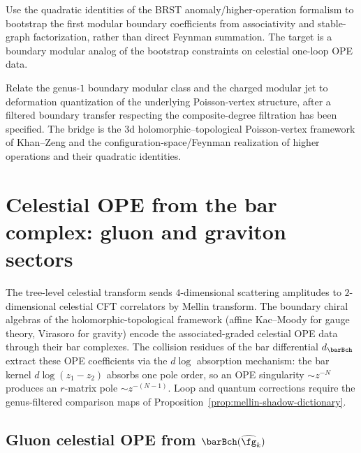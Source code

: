 \begin{problem}
\label{prob:modular-bootstrap}
Use the quadratic identities of the BRST anomaly/higher-operation formalism to bootstrap the
first modular boundary coefficients from associativity and stable-graph factorization,
rather than direct Feynman summation. The target is a boundary modular analog of
the bootstrap constraints on celestial one-loop OPE data.
\end{problem}

\begin{problem}
\label{prob:quantization-boundary-modular-class}
Relate the genus-$1$ boundary modular class and the charged modular jet to deformation
quantization of the underlying Poisson-vertex structure, after a filtered boundary
transfer respecting the composite-degree filtration has been specified. The bridge is the
$3$d holomorphic--topological Poisson-vertex framework of Khan--Zeng and the
configuration-space/Feynman realization of higher operations and their quadratic identities.
\end{problem}


\section{Celestial OPE from the bar complex: gluon and graviton sectors}
\label{sec:celestial-ope-bar-complex}

The tree-level celestial transform sends $4$-dimensional scattering amplitudes to
$2$-dimensional celestial CFT correlators by Mellin transform. The boundary chiral algebras
of the holomorphic-topological framework (affine Kac--Moody for gauge theory, Virasoro for
gravity) encode the associated-graded celestial OPE data through their bar complexes. The
collision residues of the bar differential $d_{\barBch}$ extract these OPE coefficients via
the $d\log$ absorption mechanism: the bar kernel $d\log(z_1 - z_2)$ absorbs one pole order,
so an OPE singularity $\sim z^{-N}$ produces an $r$-matrix pole $\sim z^{-(N-1)}$. Loop and
quantum corrections require the genus-filtered comparison maps of
Proposition~\ref{prop:mellin-shadow-dictionary}.

\subsection{Gluon celestial OPE from $\barBch(\widehat{\fg}_k)$}
\label{subsec:ch-core-gluon-celestial-ope}

